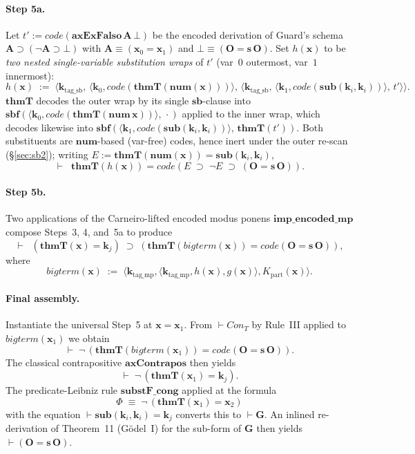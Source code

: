 \documentclass[11pt]{article}
\theoremstyle{plain}
\theoremstyle{definition}
\theoremstyle{remark}
\newcommand{\code}[1]{\mathit{code}(#1)}
\newcommand{\sub}{\mathbf{sub}}
\newcommand{\sbf}{\mathbf{sbf}}
\newcommand{\thmT}{\mathbf{thmT}}
\newcommand{\num}{\mathbf{num}}
\newcommand{\seq}[1]{\langle #1 \rangle}
\newcommand{\Con}{\mathit{Con}}
\begin{document}
\paragraph{Step 5a.}  Let $t' := \code{\mathbf{axExFalso}\,\mathbf{A}\,\bot}$
be the encoded derivation of Guard's schema $\mathbf{A} \supset
(\neg \mathbf{A} \supset \bot)$ with $\mathbf{A} \equiv (\mathbf{x}_0
= \mathbf{x}_1)$ and $\bot \equiv (\mathbf{O} = \mathbf{s}\,\mathbf{O})$.
Set $h(\mathbf{x})$ to be \emph{two nested single-variable substitution
wraps} of $t'$ (var~$0$ outermost, var~$1$ innermost):
\[
h(\mathbf{x}) \;:=\; \seq{\mathbf{k}_{\mathrm{tag\_sb}},\, \seq{\mathbf{k}_0, \code{\thmT(\num(\mathbf{x}))}},\,
   \seq{\mathbf{k}_{\mathrm{tag\_sb}},\, \seq{\mathbf{k}_1, \code{\sub(\mathbf{k}_i, \mathbf{k}_i)}},\, t'}}.
\]
$\thmT$ decodes the outer wrap by its single $\mathbf{sb}$-clause into
$\sbf(\seq{\mathbf{k}_0, \code{\thmT(\num\,\mathbf{x})}},\, \cdot)$ applied to
the inner wrap, which decodes likewise into
$\sbf(\seq{\mathbf{k}_1, \code{\sub(\mathbf{k}_i,\mathbf{k}_i)}},\, \thmT(t'))$.
Both substituents are $\num$-based (var-free) codes, hence inert under the
outer re-scan ({\S}\ref{sec:sb2}); writing
$E := \thmT(\num(\mathbf{x})) = \sub(\mathbf{k}_i, \mathbf{k}_i)$,
\[
\vdash \;\;\thmT(h(\mathbf{x})) = \code{E \;\supset\; \neg E \;\supset\; (\mathbf{O} = \mathbf{s}\,\mathbf{O})}.
\]

\paragraph{Step 5b.}  Two applications of the Carneiro-lifted encoded
modus ponens $\mathbf{imp\_encoded\_mp}$ compose Steps~3, 4, and~5a to
produce
\[
\vdash \;\;(\thmT(\mathbf{x}) = \mathbf{k}_j) \;\supset\; (\thmT(\mathit{bigterm}(\mathbf{x})) = \code{\mathbf{O} = \mathbf{s}\,\mathbf{O}}),
\]
where
\[
\mathit{bigterm}(\mathbf{x}) \;:=\; \seq{\mathbf{k}_{\mathrm{tag\_mp}}, \seq{\mathbf{k}_{\mathrm{tag\_mp}}, h(\mathbf{x}), g(\mathbf{x})}, K_{\mathrm{part}}(\mathbf{x})}.
\]

\paragraph{Final assembly.}  Instantiate the universal Step~5 at
$\mathbf{x} = \mathbf{x}_1$.  From $\vdash \Con_T$ by Rule~III applied
to $\mathit{bigterm}(\mathbf{x}_1)$ we obtain
\[
\vdash \;\neg\,(\thmT(\mathit{bigterm}(\mathbf{x}_1)) = \code{\mathbf{O} = \mathbf{s}\,\mathbf{O}}).
\]
The classical contrapositive $\mathbf{axContrapos}$ then yields
\[
\vdash \;\neg\,(\thmT(\mathbf{x}_1) = \mathbf{k}_j).
\]
The predicate-Leibniz rule $\mathbf{substF\_cong}$ applied at the
formula
\[
\Phi \;\equiv\; \neg\,(\thmT(\mathbf{x}_1) = \mathbf{x}_2)
\]
with the equation $\vdash \sub(\mathbf{k}_i, \mathbf{k}_i) = \mathbf{k}_j$
converts this to $\vdash \mathbf{G}$.  An inlined re-derivation of
Theorem~11 (G\"odel~I) for the sub-form of $\mathbf{G}$ then yields
$\vdash (\mathbf{O} = \mathbf{s}\,\mathbf{O})$.
\end{document}
